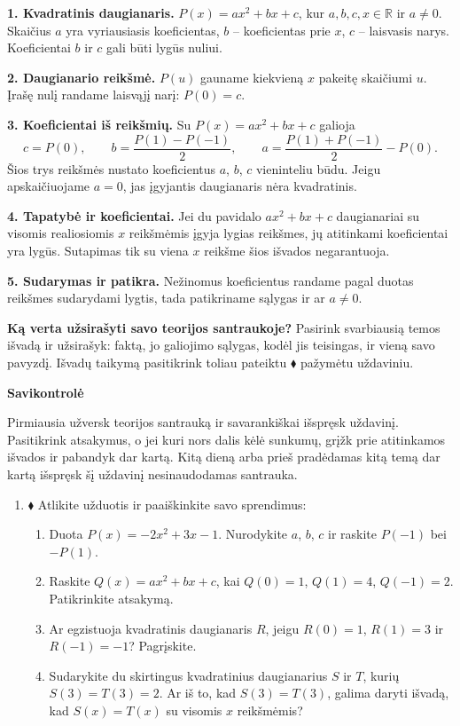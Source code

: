 \documentclass[12pt,a4paper]{exam}
\begin{document}
\begin{tcolorbox}[title=Svarbiausios temos išvados,colback=black!3,colframe=black!65,boxrule=0.6pt,arc=2mm]
\textbf{1. Kvadratinis daugianaris.} $P(x)=ax^2+bx+c$, kur $a,b,c,x\in\mathbb R$ ir $a\ne0$. Skaičius $a$ yra vyriausiasis koeficientas, $b$ – koeficientas prie $x$, $c$ – laisvasis narys. Koeficientai $b$ ir $c$ gali būti lygūs nuliui.

\textbf{2. Daugianario reikšmė.} $P(u)$ gauname kiekvieną $x$ pakeitę skaičiumi $u$. Įrašę nulį randame laisvąjį narį: $P(0)=c$.

\textbf{3. Koeficientai iš reikšmių.} Su $P(x)=ax^2+bx+c$ galioja
\[
c=P(0),\qquad b=\frac{P(1)-P(-1)}{2},\qquad a=\frac{P(1)+P(-1)}{2}-P(0).
\]
Šios trys reikšmės nustato koeficientus $a$, $b$, $c$ vieninteliu būdu. Jeigu apskaičiuojame $a=0$, jas įgyjantis daugianaris nėra kvadratinis.

\textbf{4. Tapatybė ir koeficientai.} Jei du pavidalo $ax^2+bx+c$ daugianariai su visomis realiosiomis $x$ reikšmėmis įgyja lygias reikšmes, jų atitinkami koeficientai yra lygūs. Sutapimas tik su viena $x$ reikšme šios išvados negarantuoja.

\textbf{5. Sudarymas ir patikra.} Nežinomus koeficientus randame pagal duotas reikšmes sudarydami lygtis, tada patikriname sąlygas ir ar $a\ne0$.
\end{tcolorbox}
\textbf{Ką verta užsirašyti savo teorijos santraukoje?} Pasirink svarbiausią temos išvadą ir užsirašyk: faktą, jo galiojimo sąlygas, kodėl jis teisingas, ir vieną savo pavyzdį. Išvadų taikymą pasitikrink toliau pateiktu $\blacklozenge$ pažymėtu uždaviniu.
\newpage
\begin{center}{\Large\bfseries Savikontrolė}\end{center}
Pirmiausia užversk teorijos santrauką ir savarankiškai išspręsk uždavinį. Pasitikrink atsakymus, o jei kuri nors dalis kėlė sunkumų, grįžk prie atitinkamos išvados ir pabandyk dar kartą. Kitą dieną arba prieš pradėdamas kitą temą dar kartą išspręsk šį uždavinį nesinaudodamas santrauka.
\begin{enumerate}[resume]
\item $\blacklozenge$ Atlikite užduotis ir paaiškinkite savo sprendimus:
\begin{enumerate}
\item Duota $P(x)=-2x^2+3x-1$. Nurodykite $a$, $b$, $c$ ir raskite $P(-1)$ bei $-P(1)$.
\item Raskite $Q(x)=ax^2+bx+c$, kai $Q(0)=1$, $Q(1)=4$, $Q(-1)=2$. Patikrinkite atsakymą.
\item Ar egzistuoja kvadratinis daugianaris $R$, jeigu $R(0)=1$, $R(1)=3$ ir $R(-1)=-1$? Pagrįskite.
\item Sudarykite du skirtingus kvadratinius daugianarius $S$ ir $T$, kurių $S(3)=T(3)=2$. Ar iš to, kad $S(3)=T(3)$, galima daryti išvadą, kad $S(x)=T(x)$ su visomis $x$ reikšmėmis?
\end{enumerate}
\end{enumerate}
\end{document}
